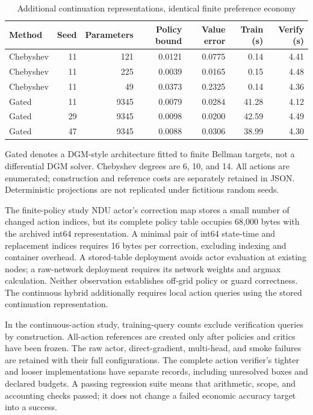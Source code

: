 \begin{table}[htbp]\centering
\caption{Additional continuation representations, identical finite preference economy}
\begin{small}\begin{tabular}{lrrrrrr}
\toprule
Method & Seed & Parameters & Policy bound & Value error & Train (s) & Verify (s) \\
\midrule
Chebyshev & 11 & 121 & 0.0121 & 0.0775 & 0.14 & 4.41 \\
Chebyshev & 11 & 225 & 0.0039 & 0.0165 & 0.15 & 4.48 \\
Chebyshev & 11 & 49 & 0.0373 & 0.2325 & 0.14 & 4.36 \\
Gated & 11 & 9345 & 0.0079 & 0.0284 & 41.28 & 4.12 \\
Gated & 29 & 9345 & 0.0098 & 0.0200 & 42.59 & 4.49 \\
Gated & 47 & 9345 & 0.0088 & 0.0306 & 38.99 & 4.30 \\
\bottomrule\end{tabular}\end{small}
\par\smallskip\begin{minipage}{0.96\linewidth}\footnotesize Gated denotes a DGM-style architecture fitted to finite Bellman targets, not a differential DGM solver. Chebyshev degrees are 6, 10, and 14. All actions are enumerated; construction and reference costs are separately retained in JSON. Deterministic projections are not replicated under fictitious random seeds.\end{minipage}
\end{table}


The finite-policy study NDU actor's correction map stores a small number of changed action indices, but its complete policy table occupies 68,000 bytes with the archived int64 representation. A minimal pair of int64 state-time and replacement indices requires 16 bytes per correction, excluding indexing and container overhead. A stored-table deployment avoids actor evaluation at existing nodes; a raw-network deployment requires its network weights and argmax calculation. Neither observation establishes off-grid policy or guard correctness. The continuous hybrid additionally requires local action queries using the stored continuation representation.

In the continuous-action study, training-query counts exclude verification queries by construction. All-action references are created only after policies and critics have been frozen. The raw actor, direct-gradient, multi-head, and smoke failures are retained with their full configurations. The complete action verifier's tighter and looser implementations have separate records, including unresolved boxes and declared budgets. A passing regression suite means that arithmetic, scope, and accounting checks passed; it does not change a failed economic accuracy target into a success.

